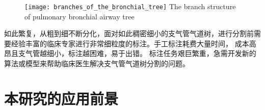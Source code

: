 \begin{figure}[!htp]
	\centering
	\texttt{[image: branches\_of\_the\_bronchial\_tree]}
		{The branch structure of pulmonary bronchial airway tree}
	\label{fig:branches_of_bronchial_tree}	
\end{figure}

如此繁复，从粗到细不断分化，面对如此稠密细小的支气管气道树，进行分割前需要经验丰富的临床专家进行非常细粒度的标注。手工标注耗费大量时间，
成本高昂且支气管越细小，标注越困难，易于出错。 标注任务艰巨繁重，急需开发新的算法或模型来帮助临床医生解决支气管气道树分割的问题。

\section{本研究的应用前景}

